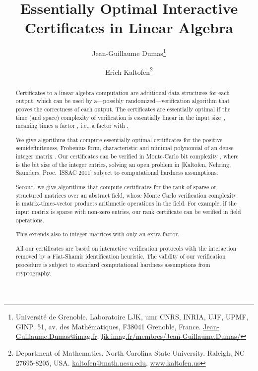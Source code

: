 \documentclass{article}
\author{\addtocounter{footnote}{1}  
Jean-Guillaume Dumas\footnote{
Universit\'e de Grenoble. 
Laboratoire LJK,
umr CNRS, INRIA, UJF, UPMF, GINP.
51, av. des Math\'ematiques, F38041 Grenoble, France.
\href{mailto:Jean-Guillaume.Dumas@imag.fr}{Jean-Guillaume.Dumas@imag.fr},
\href{http://ljk.imag.fr/membres/Jean-Guillaume.Dumas/}{ljk.imag.fr/membres/Jean-Guillaume.Dumas/}
}
\and  
Erich Kaltofen\footnote{
Department of Mathematics.
North Carolina State University.
Raleigh, NC 27695-8205, USA.
\href{mailto:kaltofen@math.ncsu.edu}{kaltofen@math.ncsu.edu},
\href{http://www.kaltofen.us}{www.kaltofen.us}
}
}
\title{Essentially Optimal Interactive Certificates in Linear Algebra\texorpdfstring{\raisebox{0ex}{*}}{}}
\newcommand{\makeconference}{}
\begin{document}
\makeconference
\maketitle
\def\thefootnote{\fnsymbol{footnote}}  

\begin{abstract}
 
 
 
 
 
 
 
 
 
 
 
 
 
 
 
 
 
 
 
 
Certificates to a linear algebra computation are
additional data structures for each output, which can be used
by a---possibly randomized---verification algorithm that proves the
correctness of each output.  The certificates are essentially optimal
if the time
(and space)  
complexity of verification is essentially linear
in the input size~, meaning
 times  
a factor ,
i.e.,  
a factor  with   .

We give algorithms that compute essentially optimal certificates for the positive semidefiniteness,
Frobenius form, characteristic and minimal polynomial of an  dense
integer matrix .  Our certificates can be verified in Monte-Carlo bit
complexity , where  is the bit size of the
integer entries,
solving  
an open problem in [Kaltofen, Nehring, Saunders, Proc.\ ISSAC 2011] subject
to computational hardness assumptions.

Second, we give algorithms that compute certificates for the rank of sparse or structured
 matrices over an abstract field, whose Monte Carlo verification complexity
is  matrix-times-vector products   arithmetic operations in the field.
For example, if the  input matrix is sparse with
 non-zero entries,  
our rank certificate can be verified in
 field operations.
 
This extends also to integer matrices with only an extra 
factor.

All our certificates are based on interactive verification protocols with
the interaction removed by a Fiat-Shamir identification heuristic.  The
validity of our verification procedure is subject to
standard computational hardness assumptions from cryptography.  
\par  
\end{abstract}
 
\end{document}
